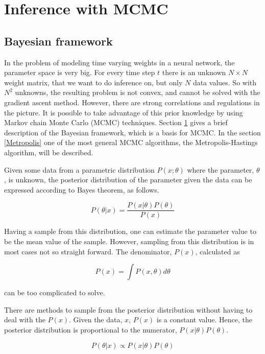 \section{Inference with MCMC}
\label{Bayesian}

\subsection{Bayesian framework}
In the problem of modeling time varying weights in a neural network, the parameter space is very big. For every time step $t$ there is an unknown $N \times N$ weight matrix, that we want to do inference on, but only $N$ data values. So with $N^2$ unknowns, the resulting problem is not convex, and cannot be solved with the gradient ascent method. However, there are strong correlations and regulations in the picture. It is possible to take advantage of this prior knowledge by using Markov chain Monte Carlo (MCMC) techniques. Section \ref{Bayesian} gives a brief description of the Bayesian framework, which is a basis for MCMC. In the section \ref{Metropolis} one of the most general MCMC algorithms, the  Metropolis-Hastings algorithm, will be described.

Given some data from a parametric distribution $P(x;\theta)$ where the parameter, $\theta$, is unknown, the posterior distribution of the parameter given the data can be expressed according to Bayes theorem, as follows.

\begin{equation}
    P(\theta | x) = \frac{P(x|\theta)P(\theta)}{P(x)}
\end{equation}

Having a sample from this distribution, one can estimate the parameter value to be the mean value of the sample. However, sampling from this distribution is in most cases not so straight forward. The denominator, $P(x)$, calculated as

\begin{equation}
    P(x) = \int P(x,\theta)d\theta
\end{equation}

can be too complicated to solve. 

There are methods to sample from the posterior distribution without having to deal with the $P(x)$. Given the data, $x$, $P(x)$ is a constant value. Hence, the posterior distribution is proportional to the numerator, $P(x|\theta)P(\theta)$. 

\begin{equation}
    P(\theta | x) \propto P(x|\theta)P(\theta)
\end{equation}

